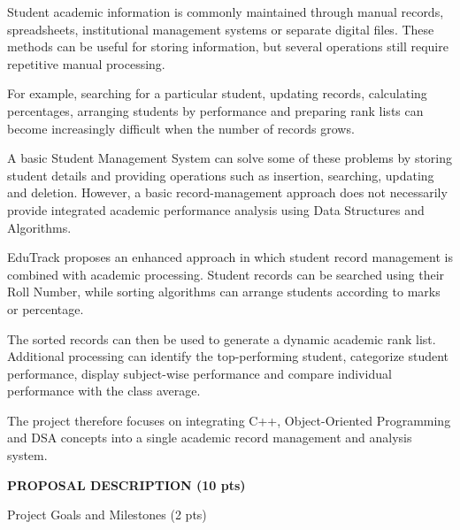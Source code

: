 \documentclass[11pt,a4paper]{article}
\newcommand{\blueheading}[1]{%
  {\sffamily\color{TitleBlue}\fontsize{15}{18}\selectfont #1}%
}
\newcommand{\bluebigheading}[1]{%
  {\sffamily\bfseries\color{TitleBlue}\fontsize{16}{19}\selectfont #1}%
}
\begin{document}
\vspace{3mm}
\begin{answerbox}
Student academic information is commonly maintained through manual records, spreadsheets, institutional management systems or separate digital files. These methods can be useful for storing information, but several operations still require repetitive manual processing.

For example, searching for a particular student, updating records, calculating percentages, arranging students by performance and preparing rank lists can become increasingly difficult when the number of records grows.

A basic Student Management System can solve some of these problems by storing student details and providing operations such as insertion, searching, updating and deletion. However, a basic record-management approach does not necessarily provide integrated academic performance analysis using Data Structures and Algorithms.

EduTrack proposes an enhanced approach in which student record management is combined with academic processing. Student records can be searched using their Roll Number, while sorting algorithms can arrange students according to marks or percentage.

The sorted records can then be used to generate a dynamic academic rank list. Additional processing can identify the top-performing student, categorize student performance, display subject-wise performance and compare individual performance with the class average.

The project therefore focuses on integrating C++, Object-Oriented Programming and DSA concepts into a single academic record management and analysis system.
\end{answerbox}

\newpage

\bluebigheading{PROPOSAL DESCRIPTION (10 pts)}

\vspace{12mm}
\blueheading{Project Goals and Milestones (2 pts)}
\end{document}
